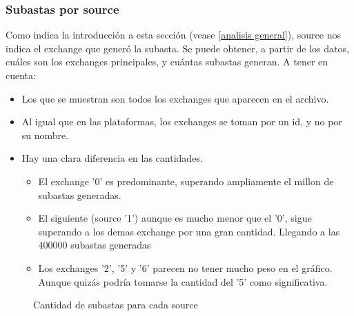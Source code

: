 \documentclass[a4paper, 12pt]{article}
\newcommand\tab[1][1cm]{\hspace*{#1}}
\begin{document}
	\subsubsection{Subastas por source}
	\tab Como indica la introducción a esta sección (vease \ref{analisis general}), source nos indica el exchange que generó la subasta. Se puede obtener, a partir de los datos, cuáles son los exchanges principales, y cuántas subastas generan.
	\tab A tener en cuenta:
	\begin{itemize}
		\item Los que se muestran son todos los exchanges que aparecen en el archivo.
		\item Al igual que en las plataformas, los exchanges se toman por un id, y no por su nombre.
		\item Hay una clara diferencia en las cantidades.
		\begin{itemize}
			\item El exchange '0' es predominante, superando ampliamente el millon de subastas generadas.
			\item El siguiente (source '1') aunque es mucho menor que el '0', sigue superando a los demas exchange por una gran cantidad. Llegando a las 400000 subastas generadas
			\item Los exchanges '2', '5' y '6' parecen no tener mucho peso en el gráfico. Aunque quizás podría tomarse la cantidad del '5' como significativa.
		\end{itemize}  
	\end{itemize}
	
	\FloatBarrier
		\begin{figure}
			\centering
		   	\caption{Cantidad de subastas para cada source}
			\label{subastassource}
		\end{figure}
	\FloatBarrier
	
\end{document}
